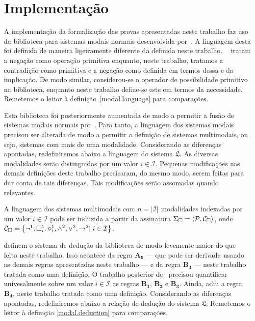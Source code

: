 \chapter{Implementação} 

A implementação da formalização das provas apresentadas neste trabalho faz uso da biblioteca para sistemas modais normais desenvolvida por~\cite{Silveira}.
A linguagem desta foi definida de maneira ligeiramente diferente da definida neste trabalho.
~\cite{Silveira} tratam a negação como operação primitiva enquanto, neste trabalho, tratamos a contradição como primitiva e a negação como definida em termos dessa e da implicação.
De modo similar, considerou-se o operador de possibilidade primitivo na biblioteca, enquanto neste trabalho define-se este em termos da necessidade.
Remetemos o leitor à definição~\ref{modal.language} para comparações.

\vspace{.3\baselineskip}
Esta biblioteca foi posteriormente aumentada de modo a permitir a fusão de sistemas modais normais por~\cite{Nunes}.
Para tanto, a linguagem dos sistemas modais precisou ser alterada de modo a permitir a definição de sistemas multimodais, ou seja, sistemas com mais de uma modalidade.
Considerando as diferenças apontadas, redefiniremos abaixo a linguagem do sistema $\mathfrak{L}$.
As diversas modalidades serão distinguidas por um valor $i\in\mathcal{I}$.
Pequenas modificações nas demais definições deste trabalho precisaram, do mesmo modo, serem feitas para dar conta de tais diferenças.
Tais modificações serão assomadas quando relevantes.

\vspace{\baselineskip}
\begin{tcolorbox}[enhanced jigsaw, breakable, sharp corners, colframe=black, colback=white, boxrule=0.5pt, left=1.5mm, right=1.5mm, top=1.5mm, bottom=1.5mm]
\begin{definition}
    A linguagem dos sistemas multimodais com $n=|\mathcal{I}|$ modalidades indexadas por um valor $i\in\mathcal{I}$ pode ser induzida a partir da assinatura $\Sigma_{\Box}=\langle\mathcal{P},\mathcal{C}_{\Box}\rangle$, onde $\mathcal{C}_{\nec}=\set{\neg^1,\nec^1_i,\pos^1_i,\wedge^2,\vee^2,\to^2\mid i\in\mathcal{I}}$.
\end{definition}
\end{tcolorbox}

\vspace{.5\baselineskip}
\cite{Silveira} definem o sistema de dedução da biblioteca de modo levemente maior do que feito neste trabalho.
Isso acontece da regra $\mathbf{A_9}$ --- que pode ser derivada usando as demais regras apresentadas neste trabalho --- e da regra $\mathbf{B_4}$ --- neste trabalho tratada como uma definição.
O trabalho posterior de~\cite{Nunes} precisou quantificar univesalmente sobre um valor $i\in\mathcal{I}$ as regras $\mathbf{B_1}$, $\mathbf{B_2}$ e $\mathbf{B_3}$.
Ainda, adiu a regra $\mathbf{B_4}$, neste trabalho tratada como uma definição.
Considerando as diferenças apontadas, redefiniremos abaixo a relação de dedução do sistema $\mathfrak{L}$.
Remetemos o leitor à definição \ref{modal.deduction} para comparações.

